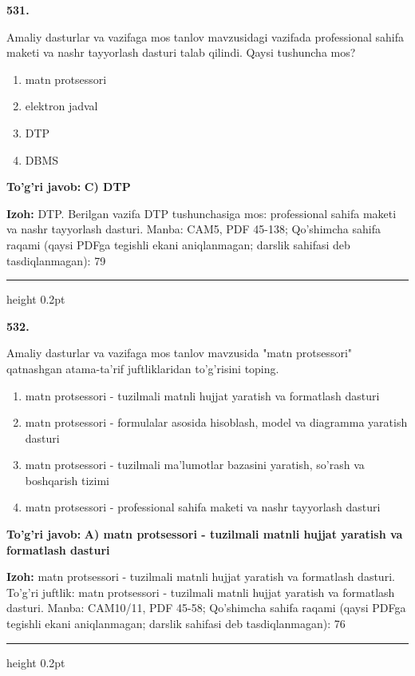 \documentclass[10pt,a4paper]{article}
\begin{document}
{\bfseries\sffamily\color{ink} 531.}
\par
Amaliy dasturlar va vazifaga mos tanlov mavzusidagi vazifada professional sahifa maketi va nashr tayyorlash dasturi talab qilindi. Qaysi tushuncha mos?
\begin{enumerate}[label=\Alph*),leftmargin=9mm]
\item matn protsessori
\item elektron jadval
\item DTP
\item DBMS
\end{enumerate}
\begin{tcolorbox}[enhanced,breakable,colback=teal!4,colframe=teal!60!black,boxrule=0.45pt,arc=1.2mm,left=2.7mm,right=2.7mm,top=1.8mm,bottom=1.8mm,before skip=2mm,after skip=2mm]
{\bfseries\sffamily\color{teal}To'g'ri javob:} \textbf{C) DTP}
\par\smallskip
{\bfseries Izoh:} DTP. Berilgan vazifa DTP tushunchasiga mos: professional sahifa maketi va nashr tayyorlash dasturi. Manba: CAM5, PDF 45-138; Qo'shimcha sahifa raqami (qaysi PDFga tegishli ekani aniqlanmagan; darslik sahifasi deb tasdiqlanmagan): 79
\end{tcolorbox}
\vspace{2mm}\hrule height 0.2pt\vspace{3mm}

{\bfseries\sffamily\color{ink} 532.}
\par
Amaliy dasturlar va vazifaga mos tanlov mavzusida "matn protsessori" qatnashgan atama-ta'rif juftliklaridan to'g'risini toping.
\begin{enumerate}[label=\Alph*),leftmargin=9mm]
\item matn protsessori - tuzilmali matnli hujjat yaratish va formatlash dasturi
\item matn protsessori - formulalar asosida hisoblash, model va diagramma yaratish dasturi
\item matn protsessori - tuzilmali ma'lumotlar bazasini yaratish, so'rash va boshqarish tizimi
\item matn protsessori - professional sahifa maketi va nashr tayyorlash dasturi
\end{enumerate}
\begin{tcolorbox}[enhanced,breakable,colback=teal!4,colframe=teal!60!black,boxrule=0.45pt,arc=1.2mm,left=2.7mm,right=2.7mm,top=1.8mm,bottom=1.8mm,before skip=2mm,after skip=2mm]
{\bfseries\sffamily\color{teal}To'g'ri javob:} \textbf{A) matn protsessori - tuzilmali matnli hujjat yaratish va formatlash dasturi}
\par\smallskip
{\bfseries Izoh:} matn protsessori - tuzilmali matnli hujjat yaratish va formatlash dasturi. To'g'ri juftlik: matn protsessori - tuzilmali matnli hujjat yaratish va formatlash dasturi. Manba: CAM10/11, PDF 45-58; Qo'shimcha sahifa raqami (qaysi PDFga tegishli ekani aniqlanmagan; darslik sahifasi deb tasdiqlanmagan): 76
\end{tcolorbox}
\vspace{2mm}\hrule height 0.2pt\vspace{3mm}
\end{document}
